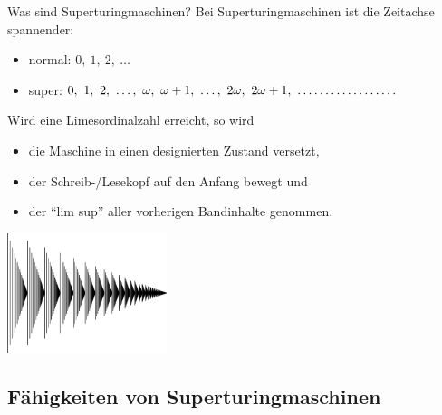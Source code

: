 \documentclass[12pt,compress,ngerman,utf8,t]{beamer}
\begin{document}
\begin{frame}{Was sind Superturingmaschinen?}
  Bei Superturingmaschinen ist die Zeitachse spannender:
  \begin{itemize}
    \item normal: $0,\ 1,\ 2,\ \ldots$
    \item super:\phantom{rl} $0,\ 1,\ 2,\ \ldots,\ \omega,\ \omega + 1,\ \ldots,\ 2\omega,\ 2\omega
    + 1,\ \makebox[\widthof{R}][l]{$\ldots\ldots\ldots\ldots\ldots\ldots$}$
  \end{itemize}
  \bigskip

  Wird eine Limesordinalzahl erreicht, so wird
  \begin{itemize}
    \item die Maschine in einen designierten Zustand versetzt,
    \item der Schreib-/Lesekopf auf den Anfang bewegt und
    \item der "`lim sup"' aller vorherigen Bandinhalte genommen.
  \end{itemize}

  \begin{center}
    \includegraphics[width=0.35\textwidth]{images/ordinal-omega-squared}
  \end{center}
\end{frame}


\subsection[Fähigkeiten]{Fähigkeiten von Superturingmaschinen}
\end{document}
